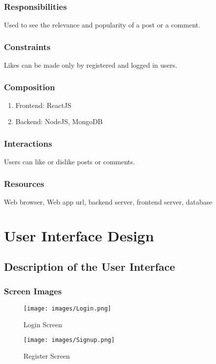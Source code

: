 \documentclass[12pt]{article}
\begin{document}
\subsubsection{Responsibilities}
Used to see the relevance and popularity of a post or a comment. 

\subsubsection{Constraints}
Likes can be made only by registered and logged in users.

\subsubsection{Composition}
\begin{enumerate}
    \item Frontend: ReactJS
    \item Backend: NodeJS, MongoDB
\end{enumerate}
\subsubsection{Interactions}
Users can like or dislike posts or comments.

\subsubsection{Resources}
Web browser, Web app url, backend server, frontend server, database


\pagebreak
	
\section{User Interface Design}
\subsection{Description of the User Interface}
\subsubsection{Screen Images}
\begin{figure} [h]
    \centering
    \texttt{[image: images/Login.png]}
    \caption{Login Screen}
\end{figure}

\begin{figure} 
    \centering
    \texttt{[image: images/Signup.png]}
    \caption{Register Screen}
\end{figure}
\end{document}
